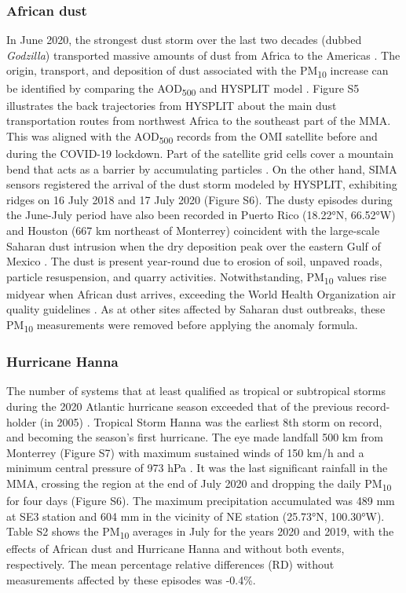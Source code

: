 \documentclass[sn-mathphys-num,iicol]{sn-jnl}
\begin{document}
\subsubsection{African dust}
In June 2020, the strongest dust storm over the last two decades (dubbed \textit{Godzilla}) transported massive amounts of dust from Africa to the Americas \citep{Francis_2020}. The origin, transport, and deposition of dust associated with the PM\textsubscript{10} increase can be identified by comparing the AOD\textsubscript{500} and HYSPLIT model \citep{Yassin_2018}. Figure S5 illustrates the back trajectories from HYSPLIT about the main dust transportation routes from northwest Africa to the southeast part of the MMA. This was aligned with the AOD\textsubscript{500} records from the OMI satellite before and during the COVID-19 lockdown. Part of the satellite grid cells cover a mountain bend that acts as a barrier by accumulating particles \citep{Gonz_lez_Santiago_2011,Martinez_2012}. On the other hand, SIMA sensors registered the arrival of the dust storm modeled by HYSPLIT, exhibiting ridges on 16 July 2018 and 17 July 2020 (Figure S6). The dusty episodes during the June-July period have also been recorded in Puerto Rico (18.22°N, 66.52°W) \citep{Euphrasie_Clotilde_2020} and Houston (667 km northeast of Monterrey) coincident with the large-scale Saharan dust intrusion \citep{Bozlaker_2013} when the dry deposition peak over the eastern Gulf of Mexico \citep{Lenes_2012}. The dust is present year-round due to erosion of soil, unpaved roads, particle resuspension, and quarry activities. Notwithstanding, PM\textsubscript{10} values rise midyear when African dust arrives, exceeding the World Health Organization air quality guidelines \citep{Prospero_2014}. As at other sites affected by Saharan dust outbreaks, these PM\textsubscript{10} measurements were removed \citep{Clemente_2022} before applying the anomaly formula.
\subsubsection{Hurricane Hanna}
The number of systems that at least qualified as tropical or subtropical storms during the 2020 Atlantic hurricane season exceeded that of the previous record-holder (in 2005) \citep{stefano2021,Beven_2021}. Tropical Storm Hanna was the earliest 8th storm on record, and becoming the season's first hurricane. The eye made landfall 500 km from Monterrey (Figure S7) with maximum sustained winds of 150 km/h and a minimum central pressure of 973 hPa \citep{conagua}. It was the last significant rainfall in the MMA, crossing the region at the end of July 2020 and dropping the daily PM\textsubscript{10} for four days (Figure S6). The maximum precipitation accumulated was 489 mm at SE3 station and 604 mm in the vicinity of NE station (25.73°N, 100.30°W). Table S2 shows the PM\textsubscript{10} averages in July for the years 2020 and 2019, with the effects of African dust and Hurricane Hanna and without both events, respectively. The mean percentage relative differences (RD) without measurements affected by these episodes was -0.4\%.
\end{document}
